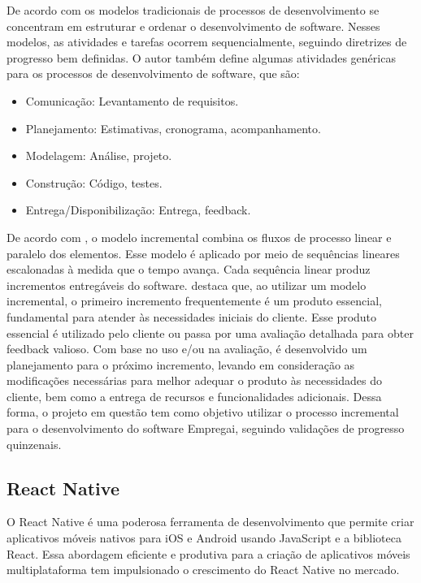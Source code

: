 De acordo com \textcite{Pressman2016} os modelos tradicionais de processos de desenvolvimento se concentram em estruturar e ordenar o desenvolvimento de software. 
Nesses modelos, as atividades e tarefas ocorrem sequencialmente, seguindo diretrizes de progresso bem definidas. O autor também define algumas atividades genéricas
para os processos de desenvolvimento de software, que são:
\begin{itemize}[label=$\bullet$]
	\item Comunicação: Levantamento de requisitos.
	\item Planejamento: Estimativas, cronograma, acompanhamento.
	\item Modelagem: Análise, projeto.
	\item Construção: Código, testes.
	\item Entrega/Disponibilização: Entrega, feedback.
	\end{itemize}
	De acordo com \textcite{Pressman2016}, o modelo incremental combina os fluxos de processo linear e paralelo dos elementos. Esse modelo é aplicado por
	meio de sequências lineares escalonadas à medida que o tempo avança. Cada sequência linear produz incrementos entregáveis do software.
	\textcite{Pressman2016} destaca que, ao utilizar um modelo incremental, o primeiro incremento frequentemente é um produto essencial, fundamental 
	para atender às necessidades iniciais do cliente. Esse produto essencial é utilizado pelo cliente ou passa por uma avaliação detalhada para obter feedback valioso. 
	Com base no uso e/ou na avaliação, é desenvolvido um planejamento para o próximo incremento, levando em consideração as modificações necessárias para melhor adequar o 
	produto às necessidades do cliente, bem como a entrega de recursos e funcionalidades adicionais.
	\newline Dessa forma, o projeto em questão tem como objetivo utilizar o processo incremental para o desenvolvimento do software Empregai, seguindo validações de progresso quinzenais.
	
\subsection{React Native}
O React Native é uma poderosa ferramenta de desenvolvimento que permite criar aplicativos móveis nativos para iOS e Android usando JavaScript e a biblioteca React. Essa abordagem eficiente e produtiva para a criação de aplicativos móveis multiplataforma tem impulsionado o crescimento do React Native no mercado.

